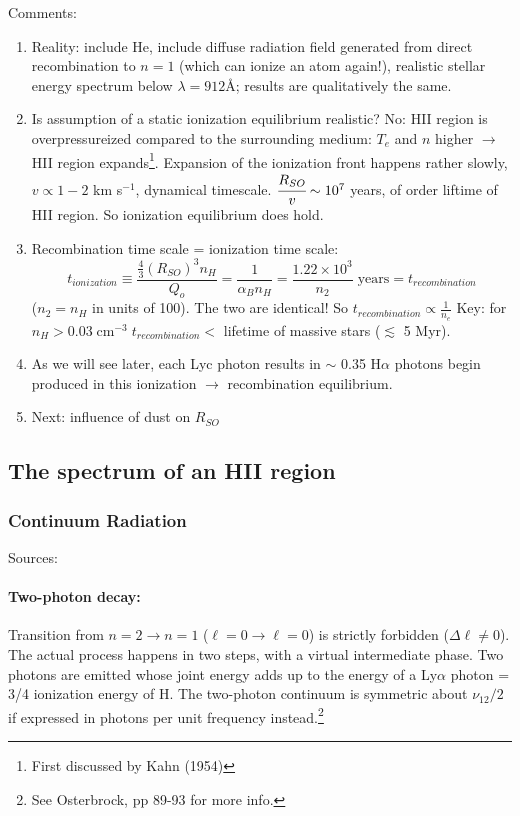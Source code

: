 \documentclass[11pt]{article}
\newcommand{\mar}[1]{\hspace{0pt}\marginpar{-\textcolor{black}{#1}-}}
\begin{document}
\mar{58}Comments:
\begin{enumerate}
    \item Reality: include He, include diffuse radiation field generated
        from direct recombination to $n=1$ (which can ionize an atom again!),
        realistic stellar energy spectrum below $\lambda = 912$\AA{};
        results are qualitatively the same.
    \item Is assumption of a static ionization equilibrium realistic? No: HII
        region is overpressureized compared to the surrounding medium: $T_{e}$ and
        $n$ higher $\longrightarrow$ HII region expands\footnote{First discussed
        by Kahn (1954)}. Expansion of the ionization front happens rather
        slowly, $v \propto 1-2$ km s$^{-1}$, dynamical timescale.
        $\cfrac{R_{SO}}{v} \sim 10^{7}$ years, of order liftime of HII region.
        So ionization equilibrium does hold.
    \item Recombination time scale = ionization time scale:$${
            t_{ionization} \equiv \frac{\frac{4}{3}(R_{SO})^{3}n_{H}}{Q_{o}} =
            \frac{1}{\alpha_{B}n_{H}} =
            \frac{1.22\times10^{3}}{n_{2}}\;\mathrm{years} =
            t_{recombination}
        }$$
        ($n_{2} = n_{H}$ in units of 100). The two are identical! So
        $t_{recombination} \propto \frac{1}{n_{e}}$
        Key: for $n_{H} > 0.03\;\mathrm{cm}^{-3}\;t_{recombination} <$
        lifetime of massive stars ($\lesssim$ 5 Myr).
    \item As we will see later, each Lyc photon results in $\sim$ 0.35
        H$\alpha$ photons begin produced in this ionization $\rightarrow$
        recombination equilibrium.
    \item Next: influence of dust on $R_{SO}$
\end{enumerate}

\subsection{The spectrum of an HII region}
\mar{63}
\subsubsection{Continuum Radiation}
Sources:
\paragraph{Two-photon decay:}
Transition from $n=2 \rightarrow n=1$ ($\ell=0 \rightarrow \ell=0$) is
strictly forbidden ($\Delta\ell \neq 0$).
The actual process happens in two steps, with a virtual intermediate
phase. Two photons are emitted whose joint energy adds up to the energy
of a Ly$\alpha$ photon = 3/4 ionization energy of H. The two-photon
continuum is symmetric about $\nu_{12}/2$ if expressed in photons
per unit frequency instead.\footnote{See Osterbrock, pp 89-93 for more info.}
\end{document}
